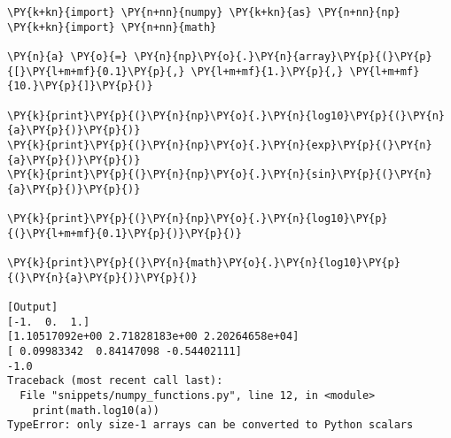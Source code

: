 \begin{Verbatim}[label=\makebox{\url{https://bitbucket.org/lbaldini/programming/src/tip/snippets/numpy\_functions.py}},commandchars=\\\{\}]
\PY{k+kn}{import} \PY{n+nn}{numpy} \PY{k+kn}{as} \PY{n+nn}{np}
\PY{k+kn}{import} \PY{n+nn}{math}

\PY{n}{a} \PY{o}{=} \PY{n}{np}\PY{o}{.}\PY{n}{array}\PY{p}{(}\PY{p}{[}\PY{l+m+mf}{0.1}\PY{p}{,} \PY{l+m+mf}{1.}\PY{p}{,} \PY{l+m+mf}{10.}\PY{p}{]}\PY{p}{)}

\PY{k}{print}\PY{p}{(}\PY{n}{np}\PY{o}{.}\PY{n}{log10}\PY{p}{(}\PY{n}{a}\PY{p}{)}\PY{p}{)}
\PY{k}{print}\PY{p}{(}\PY{n}{np}\PY{o}{.}\PY{n}{exp}\PY{p}{(}\PY{n}{a}\PY{p}{)}\PY{p}{)}
\PY{k}{print}\PY{p}{(}\PY{n}{np}\PY{o}{.}\PY{n}{sin}\PY{p}{(}\PY{n}{a}\PY{p}{)}\PY{p}{)}

\PY{k}{print}\PY{p}{(}\PY{n}{np}\PY{o}{.}\PY{n}{log10}\PY{p}{(}\PY{l+m+mf}{0.1}\PY{p}{)}\PY{p}{)}

\PY{k}{print}\PY{p}{(}\PY{n}{math}\PY{o}{.}\PY{n}{log10}\PY{p}{(}\PY{n}{a}\PY{p}{)}\PY{p}{)}

[Output]
[-1.  0.  1.]
[1.10517092e+00 2.71828183e+00 2.20264658e+04]
[ 0.09983342  0.84147098 -0.54402111]
-1.0
Traceback (most recent call last):
  File "snippets/numpy_functions.py", line 12, in <module>
    print(math.log10(a))
TypeError: only size-1 arrays can be converted to Python scalars
\end{Verbatim}